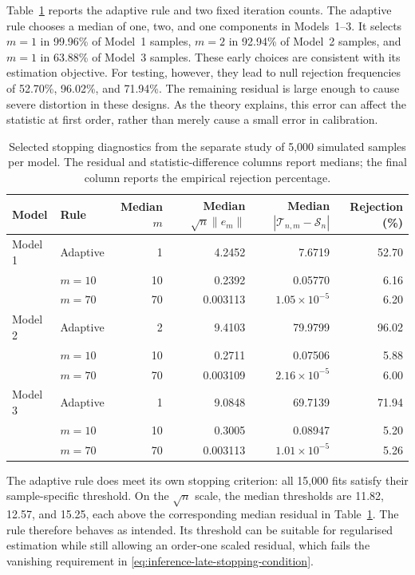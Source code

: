 Table~\ref{tab:inference-stopping-selected} reports the adaptive rule and two
fixed iteration counts.  The adaptive rule chooses a median of one, two,
and one components in Models~1--3.  It selects $m=1$ in 99.96\% of Model~1
samples, $m=2$ in 92.94\% of Model~2 samples, and $m=1$ in 63.88\% of
Model~3 samples.  These early choices are consistent with its estimation
objective.  For testing, however, they lead to null rejection frequencies
of 52.70\%, 96.02\%, and 71.94\%.  The remaining residual is large enough
to cause severe distortion in these designs.  As the theory explains, this
error can affect the statistic at first order, rather than merely cause a
small error in calibration.

\begin{table}[htbp]
    \centering
    \small
    \caption[Selected stopping diagnostics]{Selected stopping diagnostics from the separate study of 5,000
    simulated samples per model.  The residual and statistic-difference columns report medians;
    the final column reports the empirical rejection percentage.}
    \label{tab:inference-stopping-selected}
    \begin{tabular}{@{}llrrrr@{}}
        \toprule
        Model & Rule & Median $m$ & Median $\sqrt n\|e_m\|$
              & Median $|\mathcal T_{n,m}-\mathcal S_n|$ & Rejection (\%) \\
        \midrule
        Model 1 & Adaptive & 1  & 4.2452 & 7.6719 & 52.70 \\
                & $m=10$   & 10 & 0.2392 & 0.05770 & 6.16 \\
                & $m=70$   & 70 & 0.003113 & $1.05\times10^{-5}$ & 6.20 \\
        \addlinespace
        Model 2 & Adaptive & 2  & 9.4103 & 79.9799 & 96.02 \\
                & $m=10$   & 10 & 0.2711 & 0.07506 & 5.88 \\
                & $m=70$   & 70 & 0.003109 & $2.16\times10^{-5}$ & 6.00 \\
        \addlinespace
        Model 3 & Adaptive & 1  & 9.0848 & 69.7139 & 71.94 \\
                & $m=10$   & 10 & 0.3005 & 0.08947 & 5.20 \\
                & $m=70$   & 70 & 0.003113 & $1.01\times10^{-5}$ & 5.26 \\
        \bottomrule
    \end{tabular}
\end{table}

The adaptive rule does meet its own stopping criterion: all 15,000 fits
satisfy their sample-specific threshold.  On the $\sqrt n$ scale, the
median thresholds are 11.82, 12.57, and 15.25, each above the corresponding
median residual in Table~\ref{tab:inference-stopping-selected}.  The rule
therefore behaves as intended.  Its threshold can be suitable for
regularised estimation while still allowing an order-one scaled residual,
which fails the vanishing requirement in
\eqref{eq:inference-late-stopping-condition}.

